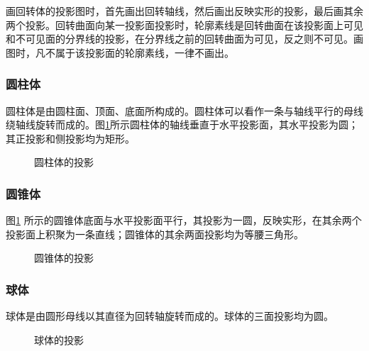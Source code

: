 画回转体的投影图时，首先画出回转轴线，然后画出反映实形的投影，最后画其余两个投影。回转曲面向某一投影面投影时，轮廓素线是回转曲面在该投影面上可见和不可见面的分界线的投影，在分界线之前的回转曲面为可见，反之则不可见。画图时，凡不属于该投影面的轮廓素线，一律不画出。
\subsubsection{圆柱体}
圆柱体是由圆柱面、顶面、底面所构成的。圆柱体可以看作一条与轴线平行的母线绕轴线旋转而成的。图\ref{fig:yuanzhutix}所示圆柱体的轴线垂直于水平投影面，其水平投影为圆；其正投影和侧投影均为矩形。
\begin{figure}[htbp]
\centering
{}\hspace{30pt}
\caption{圆柱体的投影}\label{fig:yuanzhutix}
\end{figure}
\subsubsection{圆锥体}
图\ref{fig:yuanzhutix} 所示的圆锥体底面与水平投影面平行，其投影为一圆，反映实形，在其余两个投影面上积聚为一条直线；圆锥体的其余两面投影均为等腰三角形。
\begin{figure}[htbp]
\centering
{}\hspace{30pt}
\caption{圆锥体的投影}\label{fig:yuanzhuiti}
\end{figure}
\subsubsection{球体}
球体是由圆形母线以其直径为回转轴旋转而成的。球体的三面投影均为圆。
\begin{figure}[htbp]
\centering
{}\hspace{30pt}
\caption{球体的投影}\label{fig:qiout}
\end{figure}

\endinput